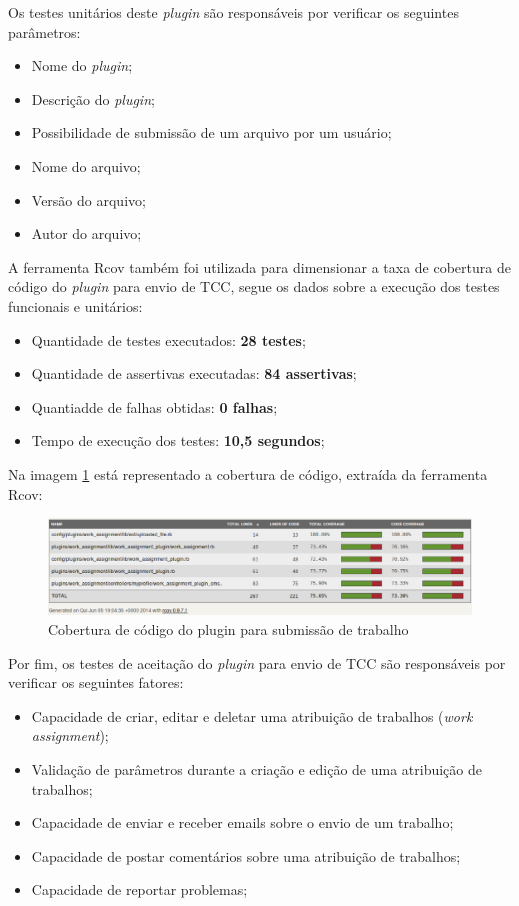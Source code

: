 Os testes unitários deste \textit{plugin} são responsáveis por verificar os seguintes parâmetros:

\begin{itemize}
\item Nome do \textit{plugin};
\item Descrição do \textit{plugin};
\item Possibilidade de submissão de um arquivo por um usuário;
\item Nome do arquivo;
\item Versão do arquivo;
\item Autor do arquivo;
\end{itemize}

A ferramenta Rcov também foi utilizada para dimensionar a taxa de cobertura de código do \textit{plugin} para envio de TCC, segue os dados sobre a execução dos testes funcionais e unitários:

\begin{itemize}
\item Quantidade de testes executados: \textbf{28 testes};
\item Quantidade de assertivas executadas: \textbf{84 assertivas};
\item Quantiadde de falhas obtidas: \textbf{0 falhas};
\item Tempo de execução dos testes: \textbf{10,5 segundos};
\end{itemize}

Na imagem \ref{consideracoes_cobertura2} está representado a cobertura de código, extraída da ferramenta Rcov:

\begin{figure}[!h]
    \centering
    \includegraphics[keepaspectratio=false,scale=0.45]
      {figuras/cobertura_tcc.eps}
    \caption{Cobertura de código do plugin para submissão de trabalho}
    \label{consideracoes_cobertura2}
\end{figure}

Por fim, os testes de aceitação do \textit{plugin} para envio de TCC são responsáveis por verificar os seguintes fatores:

\begin{itemize}
\item Capacidade de criar, editar e deletar uma atribuição de trabalhos (\textit{work assignment});
\item Validação de parâmetros durante a criação e edição de uma atribuição de trabalhos;
\item Capacidade de enviar e receber emails sobre o envio de um trabalho;
\item Capacidade de postar comentários sobre uma atribuição de trabalhos;
\item Capacidade de reportar problemas;
\end{itemize}

